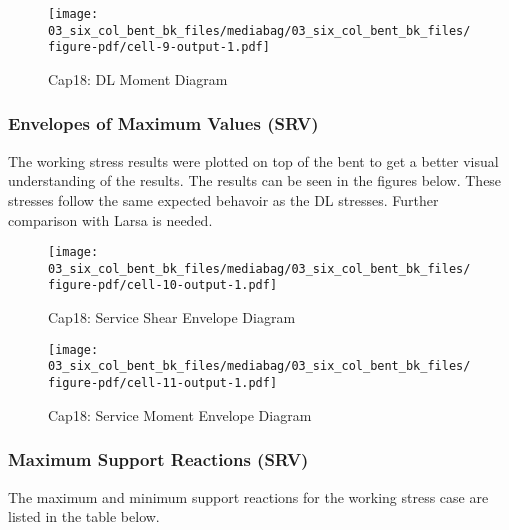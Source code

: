 \documentclass[
  letterpaper,
  DIV=11,
  numbers=noendperiod]{scrartcl}
\begin{document}
\begin{figure}[H]

{\centering \texttt{[image: 03\_six\_col\_bent\_bk\_files/mediabag/03\_six\_col\_bent\_bk\_files/figure-pdf/cell-9-output-1.pdf]}

}

\caption{Cap18: DL Moment Diagram}

\end{figure}%

\newpage{}

\subsubsection{Envelopes of Maximum Values
(SRV)}\label{envelopes-of-maximum-values-srv}

The working stress results were plotted on top of the bent to get a
better visual understanding of the results. The results can be seen in
the figures below. These stresses follow the same expected behavoir as
the DL stresses. Further comparison with Larsa is needed.

\begin{figure}[H]

{\centering \texttt{[image: 03\_six\_col\_bent\_bk\_files/mediabag/03\_six\_col\_bent\_bk\_files/figure-pdf/cell-10-output-1.pdf]}

}

\caption{Cap18: Service Shear Envelope Diagram}

\end{figure}%

\begin{figure}[H]

{\centering \texttt{[image: 03\_six\_col\_bent\_bk\_files/mediabag/03\_six\_col\_bent\_bk\_files/figure-pdf/cell-11-output-1.pdf]}

}

\caption{Cap18: Service Moment Envelope Diagram}

\end{figure}%

\subsubsection{Maximum Support Reactions
(SRV)}\label{maximum-support-reactions-srv}

The maximum and minimum support reactions for the working stress case
are listed in the table below.
\end{document}
